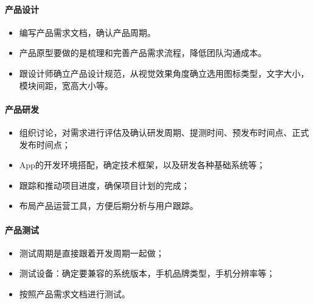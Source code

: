 \documentclass[letterpaper,11pt,english]{sphinxmanual}
\begin{document}
\paragraph{产品设计}
\label{\detokenize{chapter_project/process:id8}}\begin{itemize}
\item {} 
编写产品需求文档，确认产品周期。

\item {} 
产品原型要做的是梳理和完善产品需求流程，降低团队沟通成本。

\item {} 
跟设计师确立产品设计规范，从视觉效果角度确立选用图标类型，文字大小，模块间距，宽高大小等。

\end{itemize}


\paragraph{产品研发}
\label{\detokenize{chapter_project/process:id9}}\begin{itemize}
\item {} 
组织讨论，对需求进行评估及确认研发周期、提测时间、预发布时间点、正式发布时间点；

\item {} 
App的开发环境搭配，确定技术框架，以及研发各种基础系统等；

\item {} 
跟踪和推动项目进度，确保项目计划的完成；

\item {} 
布局产品运营工具，方便后期分析与用户跟踪。

\end{itemize}


\paragraph{产品测试}
\label{\detokenize{chapter_project/process:id10}}\begin{itemize}
\item {} 
测试周期是直接跟着开发周期一起做；

\item {} 
测试设备：确定要兼容的系统版本，手机品牌类型，手机分辨率等；

\item {} 
按照产品需求文档进行测试。

\end{itemize}
\end{document}
